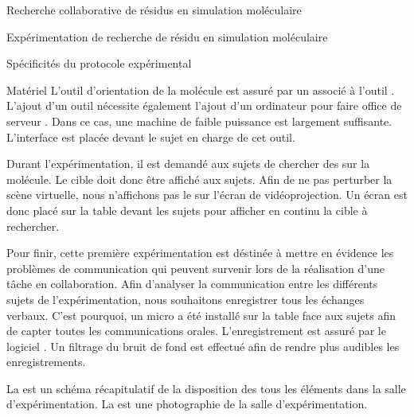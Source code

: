 \documentclass[myfrancais]{mythesis}
\begin{document}
\begin{mychapter}{Recherche collaborative de résidus en simulation moléculaire}
\begin{mysection}{Expérimentation de recherche de résidu en simulation moléculaire}
\begin{mysubsection}{Spécificités du protocole expérimental}
\begin{mysubsubsection}{Matériel}
					L'outil d'orientation de la molécule est assuré par un \myOmni associé à l'outil  .
					L'ajout d'un outil nécessite également l'ajout d'un ordinateur pour faire office de serveur .
					Dans ce cas, une machine de faible puissance est largement suffisante.
					L'interface est placée devant le sujet en charge de cet outil.

					Durant l'expérimentation, il est demandé aux sujets de chercher des  sur la molécule.
					Le  cible doit donc être affiché aux sujets.
					Afin de ne pas perturber la scène virtuelle, nous n'affichons pas le  sur l'écran de vidéoprojection.
					Un écran \myLCD {} est donc placé sur la table devant les sujets pour afficher en continu la cible à rechercher.

					Pour finir, cette première expérimentation est déstinée à mettre en évidence les problèmes de communication qui peuvent survenir lors de la réalisation d'une tâche en collaboration.
					Afin d'analyser la communication entre les différents sujets de l'expérimentation, nous souhaitons enregistrer tous les échanges verbaux.
					C'est pourquoi, un micro a été installé sur la table face aux sujets afin de capter toutes les communications orales.
					L'enregistrement est assuré par le logiciel \myAudacity.
					Un filtrage du bruit de fond est effectué \myafortiori afin de rendre plus audibles les enregistrements.

					La  est un schéma récapitulatif de la disposition des tous les éléments dans la salle d'expérimentation.
					La  est une photographie de la salle d'expérimentation.


\end{mysubsubsection}
\end{mysubsection}
\end{mysection}
\end{mychapter}
\end{document}
